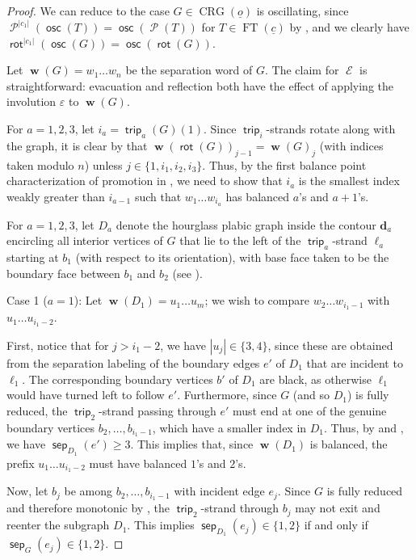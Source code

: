 \documentclass{amsart}
\theoremstyle{definition}
\theoremstyle{remark}
\numberwithin{equation}{section}
\DeclareMathOperator{\trip}{\mathsf{trip}}
\DeclareMathOperator{\osc}{\mathsf{osc}}
\DeclareMathOperator{\bw}{\mathbf{w}}
\DeclareMathOperator{\ft}{FT}
\DeclareMathOperator{\promotion}{\mathcal{P}}
\DeclareMathOperator{\evacuation}{\mathcal{E}}
\DeclareMathOperator{\sep}{\mathsf{sep}}
\DeclareMathOperator{\rot}{\mathsf{rot}}
\DeclareMathOperator{\crg}{CRG}
\newcommand{\bs}{\boldsymbol}
\begin{document}
\begin{proof}
We can reduce to the case $G \in \crg(\underline{o})$ is oscillating, since $\promotion^{|c_1|}(\osc(T))=\osc(\promotion(T))$ for $T \in \ft(\underline{c})$ by , and we clearly have $\rot^{|c_1|}(\osc(G))=\osc(\rot(G))$.

Let $\bw(G)=w_1\ldots w_n$ be the separation word of $G$. The claim for $\evacuation$ is straightforward: evacuation \cite[Thm.~6.5]{fluctuating-paper} and reflection both have the effect of applying the involution $\varepsilon$ to $\bw(G)$.

For $a=1,2,3$, let $i_a = \trip_a(G)(1)$. Since $\trip_i$-strands rotate along with the graph, it is clear by  that $\bw(\rot(G))_{j-1} = \bw(G)_j$ (with indices taken modulo $n$) unless $j \in \{1,i_1,i_2,i_3\}$. Thus, by the first balance point characterization of promotion in , we need to show that $i_a$ is the smallest index weakly greater than $i_{a-1}$ such that $w_1 \ldots w_{i_a}$ has balanced $a$'s and $a+1$'s.

For $a =1,2,3$, let $D_a$ denote the hourglass plabic graph inside the contour $\bs{d}_a$ encircling all interior vertices of $G$ that lie to the left of the $\trip_a$-strand $\ell_a$ starting at $b_1$ (with respect to its orientation), with base face taken to be the boundary face between $b_1$ and $b_2$ (see ).

\medskip
\noindent
{\sf Case 1 ($a=1$):} Let $\bw(D_1)=u_1\ldots u_m$; we wish to compare $w_2 \ldots w_{i_1-1}$ with $u_1 \ldots u_{i_1-2}$. 

First, notice that for $j>i_1-2$, we have $|u_j| \in \{3,4\}$, since these are obtained from the separation labeling of the boundary edges $e'$ of $D_1$ that are incident to $\ell_1$. The corresponding boundary vertices $b'$ of $D_1$ are black, as otherwise $\ell_1$ would have turned left to follow $e'$. Furthermore, since $G$ (and so $D_1$) is fully reduced, the $\trip_2$-strand passing through $e'$ must end at one of the genuine boundary vertices $b_2,\ldots,b_{i_1-1}$, which have a smaller index in $D_1$. Thus, by  and , we have $\sep_{D_1}(e') \geq 3$. This implies that, since $\bw(D_1)$ is balanced, the prefix $u_1\ldots u_{i_1-2}$ must have balanced $1$'s and $2$'s.

Now, let $b_j$ be among $b_2,\ldots,b_{i_1-1}$ with incident edge $e_j$. Since $G$ is fully reduced and therefore monotonic by , the $\trip_2$-strand through $b_j$ may not exit and reenter the subgraph $D_1$. This implies $\sep_{D_1}(e_j) \in \{1,2\}$ if and only if $\sep_G(e_j) \in \{1,2\}$. 


\end{proof}
\end{document}

